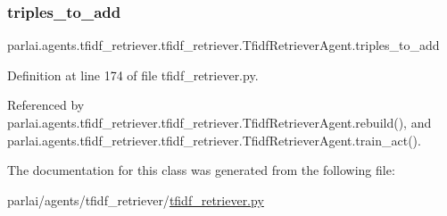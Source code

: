 \subsubsection{\texorpdfstring{triples\+\_\+to\+\_\+add}{triples\_to\_add}}
{\footnotesize\ttfamily parlai.\+agents.\+tfidf\+\_\+retriever.\+tfidf\+\_\+retriever.\+Tfidf\+Retriever\+Agent.\+triples\+\_\+to\+\_\+add}



Definition at line 174 of file tfidf\+\_\+retriever.\+py.



Referenced by parlai.\+agents.\+tfidf\+\_\+retriever.\+tfidf\+\_\+retriever.\+Tfidf\+Retriever\+Agent.\+rebuild(), and parlai.\+agents.\+tfidf\+\_\+retriever.\+tfidf\+\_\+retriever.\+Tfidf\+Retriever\+Agent.\+train\+\_\+act().



The documentation for this class was generated from the following file\+:\begin{DoxyCompactItemize}
\item 
parlai/agents/tfidf\+\_\+retriever/\hyperlink{agents_2tfidf__retriever_2tfidf__retriever_8py}{tfidf\+\_\+retriever.\+py}\end{DoxyCompactItemize}
